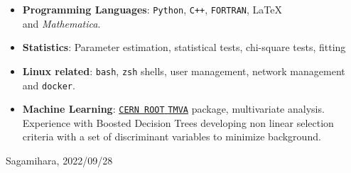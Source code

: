 \documentclass[a4paper]{article}
\begin{document}
\begin{itemize}
	\item \textbf{Programming Languages}: \texttt{Python}, \texttt{C++}, \texttt{FORTRAN}, \LaTeX \\  and \textit{Mathematica}.
  \item \textbf{Statistics}: Parameter estimation, statistical tests, chi-square
    tests, fitting
  \item \textbf{Linux related}: \texttt{bash}, \texttt{zsh} shells, user
    management, network management and \texttt{docker}.
  \item \textbf{Machine Learning}: \href{https://root.cern/manual/tmva/}{\texttt{CERN ROOT} \texttt{TMVA}} package,
    multivariate analysis. Experience with Boosted Decision Trees developing non linear selection
    criteria with a set of discriminant variables to minimize background.
  \end{itemize}
\vspace{2\baselineskip}
\noindent Sagamihara, 2022/09/28
\end{document}
